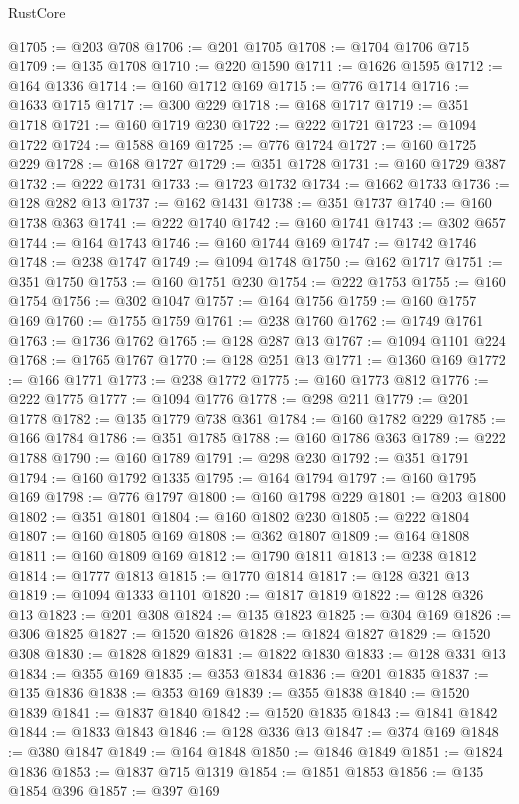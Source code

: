 \begin{lexlean}{RustCore}
\begin{coremodule}
@1705 := @203 @708
@1706 := @201 @1705
@1708 := @1704 @1706 @715
@1709 := @135 @1708
@1710 := @220 @1590
@1711 := @1626 @1595
@1712 := @164 @1336
@1714 := @160 @1712 @169
@1715 := @776 @1714
@1716 := @1633 @1715
@1717 := @300 @229
@1718 := @168 @1717
@1719 := @351 @1718
@1721 := @160 @1719 @230
@1722 := @222 @1721
@1723 := @1094 @1722
@1724 := @1588 @169
@1725 := @776 @1724
@1727 := @160 @1725 @229
@1728 := @168 @1727
@1729 := @351 @1728
@1731 := @160 @1729 @387
@1732 := @222 @1731
@1733 := @1723 @1732
@1734 := @1662 @1733
@1736 := @128 @282 @13
@1737 := @162 @1431
@1738 := @351 @1737
@1740 := @160 @1738 @363
@1741 := @222 @1740
@1742 := @160 @1741
@1743 := @302 @657
@1744 := @164 @1743
@1746 := @160 @1744 @169
@1747 := @1742 @1746
@1748 := @238 @1747
@1749 := @1094 @1748
@1750 := @162 @1717
@1751 := @351 @1750
@1753 := @160 @1751 @230
@1754 := @222 @1753
@1755 := @160 @1754
@1756 := @302 @1047
@1757 := @164 @1756
@1759 := @160 @1757 @169
@1760 := @1755 @1759
@1761 := @238 @1760
@1762 := @1749 @1761
@1763 := @1736 @1762
@1765 := @128 @287 @13
@1767 := @1094 @1101 @224
@1768 := @1765 @1767
@1770 := @128 @251 @13
@1771 := @1360 @169
@1772 := @166 @1771
@1773 := @238 @1772
@1775 := @160 @1773 @812
@1776 := @222 @1775
@1777 := @1094 @1776
@1778 := @298 @211
@1779 := @201 @1778
@1782 := @135 @1779 @738 @361
@1784 := @160 @1782 @229
@1785 := @166 @1784
@1786 := @351 @1785
@1788 := @160 @1786 @363
@1789 := @222 @1788
@1790 := @160 @1789
@1791 := @298 @230
@1792 := @351 @1791
@1794 := @160 @1792 @1335
@1795 := @164 @1794
@1797 := @160 @1795 @169
@1798 := @776 @1797
@1800 := @160 @1798 @229
@1801 := @203 @1800
@1802 := @351 @1801
@1804 := @160 @1802 @230
@1805 := @222 @1804
@1807 := @160 @1805 @169
@1808 := @362 @1807
@1809 := @164 @1808
@1811 := @160 @1809 @169
@1812 := @1790 @1811
@1813 := @238 @1812
@1814 := @1777 @1813
@1815 := @1770 @1814
@1817 := @128 @321 @13
@1819 := @1094 @1333 @1101
@1820 := @1817 @1819
@1822 := @128 @326 @13
@1823 := @201 @308
@1824 := @135 @1823
@1825 := @304 @169
@1826 := @306 @1825
@1827 := @1520 @1826
@1828 := @1824 @1827
@1829 := @1520 @308
@1830 := @1828 @1829
@1831 := @1822 @1830
@1833 := @128 @331 @13
@1834 := @355 @169
@1835 := @353 @1834
@1836 := @201 @1835
@1837 := @135 @1836
@1838 := @353 @169
@1839 := @355 @1838
@1840 := @1520 @1839
@1841 := @1837 @1840
@1842 := @1520 @1835
@1843 := @1841 @1842
@1844 := @1833 @1843
@1846 := @128 @336 @13
@1847 := @374 @169
@1848 := @380 @1847
@1849 := @164 @1848
@1850 := @1846 @1849
@1851 := @1824 @1836
@1853 := @1837 @715 @1319
@1854 := @1851 @1853
@1856 := @135 @1854 @396
@1857 := @397 @169

\end{coremodule}
\end{lexlean}
